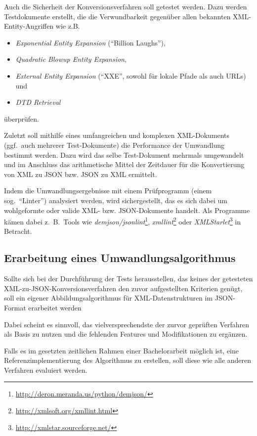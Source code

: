 \documentclass[conference]{template/IEEEtran}
\begin{document}
Auch die Sicherheit der Konversionsverfahren soll getestet werden. Dazu werden
Testdokumente erstellt, die die Verwundbarkeit gegenüber allen bekannten
XML-Entity-Angriffen\cite{morgan2014xml,spaeth2016xmlvulns} wie z.B.
\begin{itemize}
    \item \emph{Exponential Entity Expansion} (\enquote{Billion Laughs}),
    \item \emph{Quadratic Blowup Entity Expansion},
    \item \emph{External Entity Expansion} (\enquote{XXE}, sowohl für lokale Pfade als auch
    URLs)\cite{steuck2002xxe} und
    \item \emph{DTD Retrieval}
\end{itemize}
überprüfen.

Zuletzt soll mithilfe eines umfangreichen und komplexen XML-Dokuments
(ggf.~auch mehrerer Test-Dokumente) die Performance der Umwandlung bestimmt
werden. Dazu wird das selbe Test-Dokument mehrmals
umgewandelt und im Anschluss das arithmetische Mittel der Zeitdauer für die
Konvertierung von XML zu JSON bzw. JSON zu XML ermittelt.

Indem die Umwandlungsergebnisse mit einem Prüfprogramm
(einem sog.\ \enquote{Linter}) analysiert werden, wird sichergestellt, das es
sich dabei um wohlgeformte oder valide XML- bzw. JSON-Dokumente handelt. Als
Programme kämen dabei z.~B.\ Tools wie
\emph{demjson/jsonlint}\footnote{\url{http://deron.meranda.us/python/demjson/}},
\emph{xmllint}\footnote{\url{http://xmlsoft.org/xmllint.html}} oder
\emph{XMLStarlet}\footnote{\url{http://xmlstar.sourceforge.net/}} in Betracht.

\subsection{Erarbeitung eines Umwandlungsalgorithmus}
\label{subsec:development}

Sollte sich bei der Durchführung der Tests herausstellen, das keines der
getesteten XML-zu-JSON-Konversionsverfahren den zuvor aufgestellten Kriterien
genügt, soll ein eigener Abbildungsalgorithmus für
XML-Datenstrukturen im JSON-Format erarbeitet werden

Dabei scheint es sinnvoll, das vielversprechendste der zurvor geprüften
Verfahren als Basis zu nutzen und die fehlenden Features und Modifikationen
zu ergänzen.

Falls es im gesetzten zeitlichen Rahmen einer Bachelorarbeit möglich ist, eine
Referenzimplementierung des Algorithmus zu erstellen, soll diese wie alle
anderen Verfahren evaluiert werden.
\end{document}
